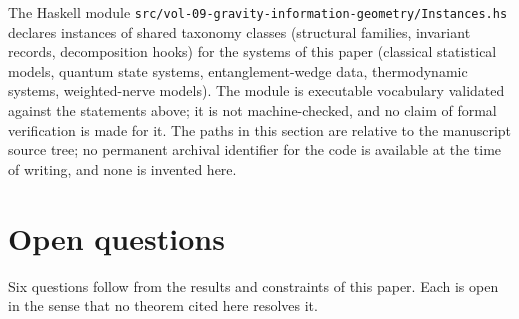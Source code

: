 \documentclass[11pt,letterpaper]{article}
\theoremstyle{definition}
\theoremstyle{remark}
\begin{document}
The Haskell module \texttt{src/vol-09-gravity-information-geometry/Instances.hs} declares instances of shared taxonomy classes (structural families, invariant records, decomposition hooks) for the systems of this paper (classical statistical models, quantum state systems, entanglement-wedge data, thermodynamic systems, weighted-nerve models). The module is executable vocabulary validated against the statements above; it is not machine-checked, and no claim of formal verification is made for it. The paths in this section are relative to the manuscript source tree; no permanent archival identifier for the code is available at the time of writing, and none is invented here.

\section{Open questions}
\label{sec:open}

Six questions follow from the results and constraints of this paper. Each is open in the sense that no theorem cited here resolves it.
\end{document}
